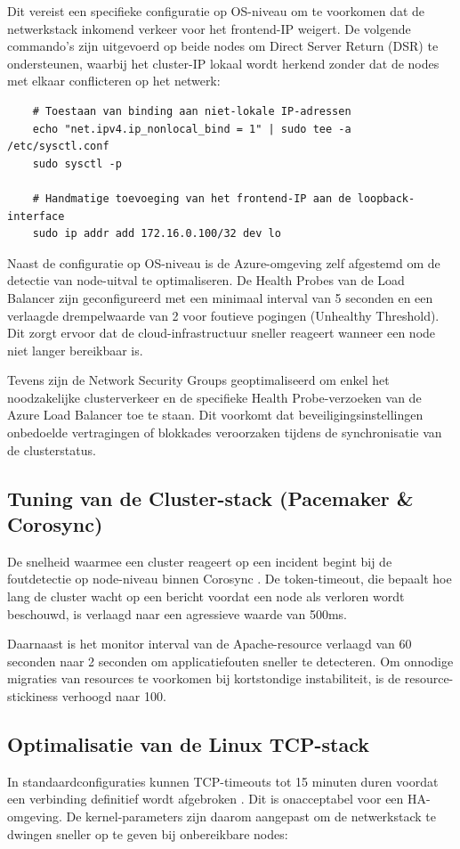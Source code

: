 Dit vereist een specifieke configuratie op OS-niveau om te voorkomen dat de netwerkstack inkomend verkeer voor het frontend-IP weigert. De volgende commando's zijn uitgevoerd op beide nodes om Direct Server Return (DSR) te ondersteunen, waarbij het cluster-IP lokaal wordt herkend zonder dat de nodes met elkaar conflicteren op het netwerk:

\begin{verbatim}
    # Toestaan van binding aan niet-lokale IP-adressen
    echo "net.ipv4.ip_nonlocal_bind = 1" | sudo tee -a /etc/sysctl.conf
    sudo sysctl -p
    
    # Handmatige toevoeging van het frontend-IP aan de loopback-interface
    sudo ip addr add 172.16.0.100/32 dev lo
\end{verbatim}

Naast de configuratie op OS-niveau is de Azure-omgeving zelf afgestemd om de detectie van node-uitval te optimaliseren. De Health Probes van de Load Balancer zijn geconfigureerd met een minimaal interval van 5 seconden en een verlaagde drempelwaarde van 2 voor foutieve pogingen (Unhealthy Threshold). Dit zorgt ervoor dat de cloud-infrastructuur sneller reageert wanneer een node niet langer bereikbaar is.
\medskip

Tevens zijn de Network Security Groups geoptimaliseerd om enkel het noodzakelijke clusterverkeer en de specifieke Health Probe-verzoeken van de Azure Load Balancer toe te staan. Dit voorkomt dat beveiligingsinstellingen onbedoelde vertragingen of blokkades veroorzaken tijdens de synchronisatie van de clusterstatus.

\subsection{Tuning van de Cluster-stack (Pacemaker \& Corosync)}
De snelheid waarmee een cluster reageert op een incident begint bij de foutdetectie op node-niveau binnen Corosync \autocite{Cubepath2026}. De token-timeout, die bepaalt hoe lang de cluster wacht op een bericht voordat een node als verloren wordt beschouwd, is verlaagd naar een agressieve waarde van 500ms.

Daarnaast is het monitor interval van de Apache-resource verlaagd van 60 seconden naar 2 seconden om applicatiefouten sneller te detecteren. Om onnodige migraties van resources te voorkomen bij kortstondige instabiliteit, is de resource-stickiness verhoogd naar 100.

\subsection{Optimalisatie van de Linux TCP-stack}
In standaardconfiguraties kunnen TCP-timeouts tot 15 minuten duren voordat een verbinding definitief wordt afgebroken \autocite{Pracucci2018}. Dit is onacceptabel voor een HA-omgeving. De kernel-parameters zijn daarom aangepast om de netwerkstack te dwingen sneller op te geven bij onbereikbare nodes:


